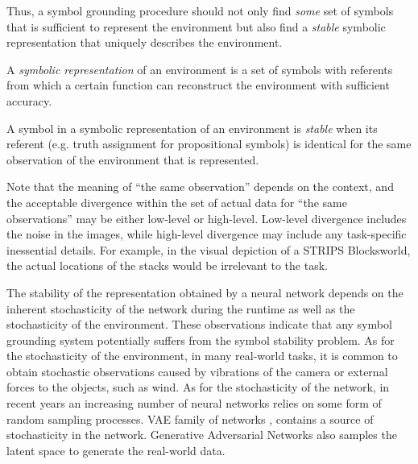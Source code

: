 

Thus, a symbol grounding procedure should not only find \emph{some} set of symbols that is sufficient to represent the
environment but also find a \emph{stable} symbolic representation that uniquely describes the environment.

\begin{defi}
A \emph{symbolic representation} of an environment is a set of symbols with referents
from which a certain function can reconstruct the environment with sufficient accuracy.
\end{defi}

\begin{defi}
A symbol in a symbolic representation of an environment is \emph{stable}
when its referent (e.g. truth assignment for propositional symbols) is identical
for the same observation of the environment that is represented.
\end{defi}

Note that the meaning of ``the same observation'' depends on the context,
and the acceptable divergence within the set of actual data for ``the same observations'' may be either low-level or high-level.
Low-level divergence includes the noise in the images,
while high-level divergence may include any task-specific inessential details.
For example, in the visual depiction of a STRIPS Blocksworld,
the actual locations of the stacks would be irrelevant to the task.





The stability of the representation obtained by a neural network depends
on
the inherent stochasticity of the network during the runtime as well as
the stochasticity of the environment.
% 
These observations indicate that any symbol grounding system potentially suffers from 
the symbol stability problem.
% 
As for the stochasticity of the environment,
in many real-world tasks, it is common to obtain stochastic observations
caused by vibrations of the camera or external forces to the objects, such as wind.
% 
As for the stochasticity of the network,
in recent years
an increasing number of neural networks relies on some form of random
sampling processes.  VAE family of networks
\cite{kingma2013auto,jang2016categorical,higgins2016beta},
contains a source of stochasticity in the network. Generative
Adversarial Networks \cite[GAN]{goodfellow2014generative} also samples
the latent space to generate the real-world data.
% 

